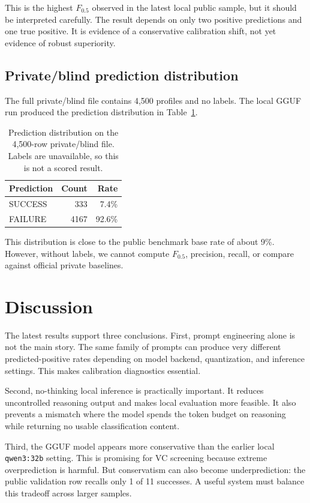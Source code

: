 \documentclass{article}
\begin{document}
This is the highest $F_{0.5}$ observed in the latest local public sample, but
it should be interpreted carefully. The result depends on only two positive
predictions and one true positive. It is evidence of a conservative calibration
shift, not yet evidence of robust superiority.

\subsection{Private/blind prediction distribution}

The full private/blind file contains 4,500 profiles and no labels. The local
GGUF run produced the prediction distribution in Table~\ref{tab:private_dist}.

\begin{table}[t]
\caption{Prediction distribution on the 4,500-row private/blind file. Labels are unavailable, so this is not a scored result.}
\label{tab:private_dist}
\centering
\begin{tabular}{lrr}
\toprule
Prediction & Count & Rate \\
\midrule
SUCCESS & 333  & 7.4\% \\
FAILURE & 4167 & 92.6\% \\
\bottomrule
\end{tabular}
\end{table}

This distribution is close to the public benchmark base rate of about 9\%.
However, without labels, we cannot compute $F_{0.5}$, precision, recall, or
compare against official private baselines.

\section{Discussion}

The latest results support three conclusions. First, prompt engineering alone is
not the main story. The same family of prompts can produce very different
predicted-positive rates depending on model backend, quantization, and inference
settings. This makes calibration diagnostics essential.

Second, no-thinking local inference is practically important. It reduces
uncontrolled reasoning output and makes local evaluation more feasible. It also
prevents a mismatch where the model spends the token budget on reasoning while
returning no usable classification content.

Third, the GGUF model appears more conservative than the earlier local
\texttt{qwen3:32b} setting. This is promising for VC screening because extreme
overprediction is harmful. But conservatism can also become underprediction: the
public validation row recalls only 1 of 11 successes. A useful system must
balance this tradeoff across larger samples.
\end{document}
